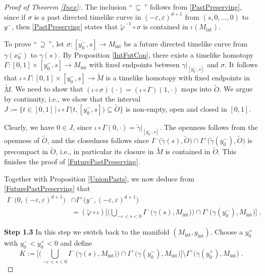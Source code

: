 \documentclass[reqno]{article}
\newcommand{\ed}{(-\varepsilon, \varepsilon)^{d+1}}
\newcommand{\Mint}{M_{\mathrm{int}}}
\newcommand{\gint}{g_{\mathrm{int}}}
\begin{document}
\begin{proof}[Proof of Theorem \ref{Inex}:]
The inclusion ``$\, \subseteq \,$'' follows from \eqref{PastPreserving}, since if $\sigma$ is a past directed timelike curve in $\ed$ from $(s,0, \ldots, 0)$ to $y^-$, then \eqref{PastPreserving} states that $\tilde{\varphi}^{-1} \circ \sigma$ is contained in $\iota(\Mint)$.

To prove ``$\, \supseteq \,$'', let $\sigma : [y_0^-, s] \to \Mint$ be a future directed timelike curve from $\gamma(x_0^-)$ to $\gamma(s)$. By Proposition \ref{IntFutCon}, there exists a timelike homotopy $\Gamma :  [0,1]\times [y^-_0,s] \to \Mint$ with fixed endpoints between $\gamma |_{[y^-_0,s]}$ and $\sigma$. It follows that $\iota \circ \Gamma: [0,1] \times [y^-_0,s]  \to \tilde{M}$ is a timelike homotopy with fixed endpoints in $\tilde{M}$. We need to show that $(\iota \circ \sigma) (\cdot)= (\iota \circ \Gamma)(1, \cdot)$ maps into $\tilde{O}$. We argue by continuity, i.e., we show that the interval $J := \{t \in [0,1] \,|\, \iota \circ \Gamma\big(t, [y^-_0,s]\big) \subseteq \tilde{O}\}$ is non-empty, open and closed in $[0,1]$.

Clearly, we have $0 \in J$, since $\iota \circ \Gamma(0, \cdot) = \tilde{\gamma}|_{[y^-_0,s]}$. The openness follows from the openness of $\tilde{O}$, and the closedness follows since $I^-\big(\tilde{\gamma}(s), \tilde{O}\big) \cap I^+ \big(\tilde{\gamma}(y^-_0),\tilde{O}\big)$ is precompact in $\tilde{O}$, i.e., in particular its closure in $\tilde{M}$ is contained in $\tilde{O}$.
This finishes the proof of \eqref{FuturePastPreserving}.

Together with Proposition \ref{UnionPasts}, we now deduce from \eqref{FuturePastPreserving} that
\begin{equation}
\label{FuturePastPreserving2}
\begin{split}
I^-\big(0, \ed\big) &\cap I^+\big(y^-, \ed\big)  \\
&= (\tilde{\varphi} \circ \iota) \Big[\Big(\bigcup_{-\varepsilon < s < 0} I^-\big(\gamma(s), \Mint \big)\Big) \cap I^+\big( \gamma(y^-_0), \Mint\big) \Big] \;.
\end{split}
\end{equation}
\vspace*{2mm}



\textbf{Step 1.3} In this step we switch back to the manifold $(\Mint,\gint)$. Choose a $y^+_0$ with $y^-_0 < y^+_0 <0$ and define 
\begin{equation}
\label{DefK}
K:=\Big[\Big(\bigcup_{-\varepsilon < s < 0} I^-\big(\gamma(s), \Mint \big)\Big) \cap I^+\big( \gamma(y^-_0), \Mint\big) \Big] \setminus I^+\big( \gamma(y^+_0), \Mint\big)  \;.
\end{equation}
\vspace*{2mm}


\end{proof}
\end{document}
